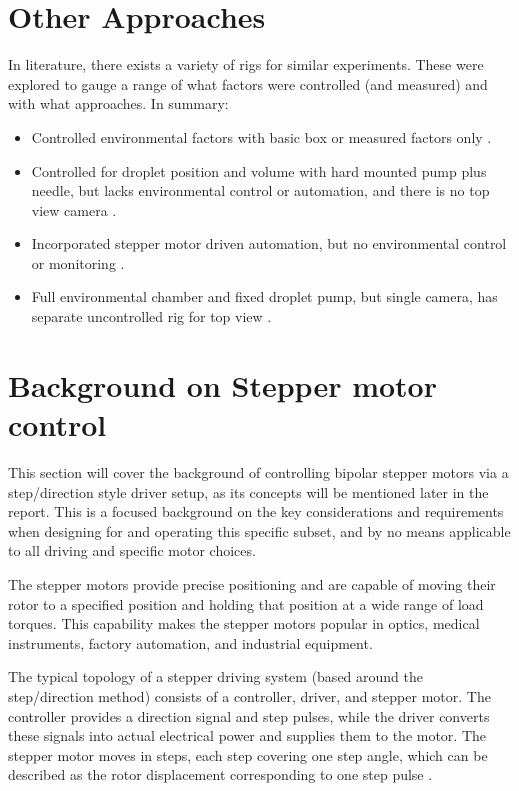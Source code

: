 \section{Other Approaches}
In literature, there exists a variety of rigs for similar experiments. These were explored to gauge a range of what factors were controlled (and measured) and with what approaches. In summary:
\begin{itemize}
    \item Controlled environmental factors with basic box \cite{step_book} or measured factors only \cite{measure_only}.
    \item Controlled for droplet position and volume with hard mounted pump plus needle, but lacks environmental control or automation, and there is no top view camera \cite{non_newt} \cite{fixed_pump}.
    \item Incorporated stepper motor driven automation, but no environmental control or monitoring \cite{motors}.
    \item Full environmental chamber and fixed droplet pump, but single camera, has separate uncontrolled rig for top view \cite{duel_rig}.
\end{itemize}

\newpage
\section{Background on Stepper motor control}
This section will cover the background of controlling bipolar stepper motors via a step/direction style driver setup, as its concepts will be mentioned later in the report. This is a focused background on the key considerations and requirements when designing for and operating this specific subset, and by no means applicable to all driving and specific motor choices.

The stepper motors provide precise positioning and are capable of moving their rotor to a specified position and holding that position at a wide range of load torques. This capability makes the stepper motors popular in optics, medical instruments, factory automation, and industrial equipment.

The typical topology of a stepper driving system (based around the step/direction method) consists of a controller, driver, and stepper motor. The controller provides a direction signal and step pulses, while the driver converts these signals into actual electrical power and supplies them to the motor. The stepper motor moves in steps, each step covering one step angle, which can be described as the rotor displacement corresponding to one step pulse \cite{step_app}.

